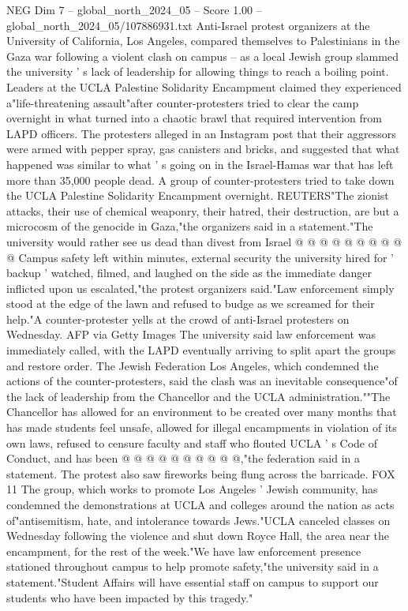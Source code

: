 \begin{textsample}{NEG Dim 7 – global\_north\_2024\_05 – Score 1.00 – global\_north\_2024\_05/107886931.txt}  \label{ex:f7_neg_400}
Anti-Israel protest organizers at the University of California, Los Angeles, compared themselves to Palestinians in the Gaza war following a violent clash on campus -- as a local Jewish group slammed the university ' s lack of leadership for allowing things to reach a boiling point.
Leaders at the UCLA Palestine Solidarity Encampment claimed they experienced a"life-threatening assault"after counter-protesters tried to clear the camp overnight in what turned into a chaotic brawl that required intervention from LAPD officers.
The protesters alleged in an Instagram post that their aggressors were armed with pepper spray, gas canisters and bricks, and suggested that what happened was similar to what ' s going on in the Israel-Hamas war that has left more than 35,000 people dead.
A group of counter-protesters tried to take down the UCLA Palestine Solidarity Encampment overnight.
REUTERS"The zionist attacks, their use of chemical weaponry, their hatred, their destruction, are but a microcosm of the genocide in Gaza,"the organizers said in a statement."The university would rather see us dead than divest from Israel @ @ @ @ @ @ @ @ @ @ Campus safety left within minutes, external security the university hired for ' backup ' watched, filmed, and laughed on the side as the immediate danger inflicted upon us escalated,"the protest organizers said."Law enforcement simply stood at the edge of the lawn and refused to budge as we screamed for their help."A counter-protester yells at the crowd of anti-Israel protesters on Wednesday.
AFP via Getty Images The university said law enforcement was immediately called, with the LAPD eventually arriving to split apart the groups and restore order.
The Jewish Federation Los Angeles, which condemned the actions of the counter-protesters, said the clash was an inevitable consequence"of the lack of leadership from the Chancellor and the UCLA administration.""The Chancellor has allowed for an environment to be created over many months that has made students feel unsafe, allowed for illegal encampments in violation of its own laws, refused to censure faculty and staff who flouted UCLA ' s Code of Conduct, and has been @ @ @ @ @ @ @ @ @ @,"the federation said in a statement.
The protest also saw fireworks being flung across the barricade.
FOX 11 The group, which works to promote Los Angeles ' Jewish community, has condemned the demonstrations at UCLA and colleges around the nation as acts of"antisemitism, hate, and intolerance towards Jews."UCLA canceled classes on Wednesday following the violence and shut down Royce Hall, the area near the encampment, for the rest of the week."We have law enforcement presence stationed throughout campus to help promote safety,"the university said in a statement."Student Affairs will have essential staff on campus to support our students who have been impacted by this tragedy."

\end{textsample}
